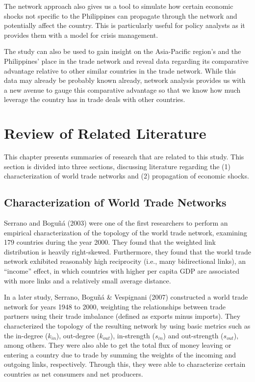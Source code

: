\documentclass[12pt,letterpaper]{report}
\begin{document}
	The network approach also gives us a tool to simulate how certain economic shocks not specific to the Philippines can propagate through the network and potentially affect the country. This is particularly useful for policy analysts as it provides them with a model for crisis management.
	
	The study can also be used to gain insight on the Asia-Pacific region’s and the Philippines' place in the trade network and reveal data regarding its comparative advantage relative to other similar countries in the trade network. While this data may already be probably known already, network analysis provides us with a new avenue to gauge this comparative advantage so that we know how much leverage the country has in trade deals with other countries.
	
\chapter{Review of Related Literature}
\label{chap:2Review}

	This chapter presents summaries of research that are related to this study. This section is divided into three sections, discussing literature regarding the (1) characterization of world trade networks and (2) propagation of economic shocks.
	
\section{Characterization of World Trade Networks}
\label{sec:21Characterization}

	Serrano and Boguñá (2003) were one of the first researchers to perform an empirical characterization of the topology of the world trade network, examining 179 countries during the year 2000. They found that the weighted link distribution is heavily right-skewed. Furthermore, they found that the world trade network exhibited reasonably high reciprocity (i.e., many bidirectional links), an ``income'' effect, in which countries with higher per capita GDP are associated with more links and a relatively small average distance.	

	In a later study, Serrano, Boguñá \& Vespignani (2007) constructed a world trade network for years 1948 to 2000, weighting the relationships between trade partners using their trade imbalance (defined as exports minus imports). They characterized the topology of the resulting network by using basic metrics such as the in-degree ($k_{in}$), out-degree ($k_{out}$), in-strength ($s_{in}$) and out-strength ($s_{out}$), among others. They were also able to get the total flux of money leaving or entering a country due to trade by summing the weights of the incoming and outgoing links, respectively. Through this, they were able to characterize certain countries as net consumers and net producers.
	
\end{document}
